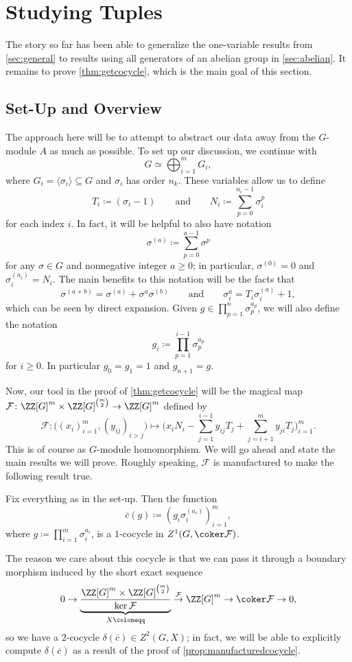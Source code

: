 \documentclass{article}
\numberwithin{equation}{section}
\begin{document}
\section{Studying Tuples} \label{sec:tuplestudy}
The story so far has been able to generalize the one-variable results from \autoref{sec:general} to results using all generators of an abelian group in \autoref{sec:abelian}. It remains to prove \autoref{thm:getcocycle}, which is the main goal of this section.

\subsection{Set-Up and Overview}
The approach here will be to attempt to abstract our data away from the $ G$-module $A$ as much as possible. To set up our discussion, we continue with
\[G\simeq\bigoplus_{i=1}^mG_i,\]
where $G_i=\langle\sigma_i\rangle\subseteq G$ and $\sigma_i$ has order $n_k$. These variables allow us to define
\[T_i\coloneqq(\sigma_i-1)\qquad\text{and}\qquad N_i\coloneqq\sum_{p=0}^{n_i-1}\sigma_i^p\]
for each index $i$. In fact, it will be helpful to also have notation
\[\sigma^{(a)}\coloneqq\sum_{p=0}^{a-1}\sigma^p\]
for any $\sigma\in G$ and nonnegative integer $a\ge0$; in particular, $\sigma^{(0)}=0$ and $\sigma_i^{(n_i)}=N_i$. The main benefits to this notation will be the facts that
\[\sigma^{(a+b)}=\sigma^{(a)}+\sigma^a\sigma^{(b)}\qquad\text{and}\qquad\sigma_i^a=T_i\sigma_i^{(a)}+1,\]
which can be seen by direct expansion. Given $g\in\prod_{p=1}^n\sigma_p^{a_p}$, we will also define the notation
\[g_i\coloneqq\prod_{p=1}^{i-1}\sigma_p^{a_p}\]
for $i\ge0$. In particular $g_0=g_1=1$ and $g_{n+1}=g$.

Now, our tool in the proof of \autoref{thm:getcocycle} will be the magical map $\mathcal F\colon\ZZ[G]^m\times\ZZ[G]^{\binom m2}\to\ZZ[G]^m$ defined by
\[\mathcal F\colon\big((x_i)_{i=1}^m,(y_{ij})_{i>j}\big)\mapsto\Bigg(x_iN_i-\sum_{j=1}^{i-1}y_{ij}T_j+\sum_{j=i+1}^my_{ji}T_j\Bigg)_{i=1}^m.\]
This is of course as $G$-module homomorphism. We will go ahead and state the main results we will prove. Roughly speaking, $\mathcal F$ is manufactured to make the following result true.
\begin{prop} \label{prop:manufacturedcocycle}
	Fix everything as in the set-up. Then the function
	\[\overline c(g)\coloneqq\left(g_i\sigma_i^{(a_i)}\right)_{i=1}^m,\]
	where $g\coloneqq\prod_{i=1}^m\sigma_i^{a_i}$, is a $1$-cocycle in $Z^1(G,\coker\mathcal F)$.
\end{prop}
The reason we care about this cocycle is that we can pass it through a boundary morphism induced by the short exact sequence
\[0\to\underbrace{\frac{\ZZ[G]^m\times\ZZ[G]^{\binom m2}}{\ker\mathcal F}}_{X\coloneqq}\stackrel{\mathcal F}\to\ZZ[G]^m\to\coker\mathcal F\to0,\]
so we have a $2$-cocycle $\delta(\overline c)\in Z^2(G,X)$; in fact, we will be able to explicitly compute $\delta(\overline c)$ as a result of the proof of \autoref{prop:manufacturedcocycle}.
\end{document}
